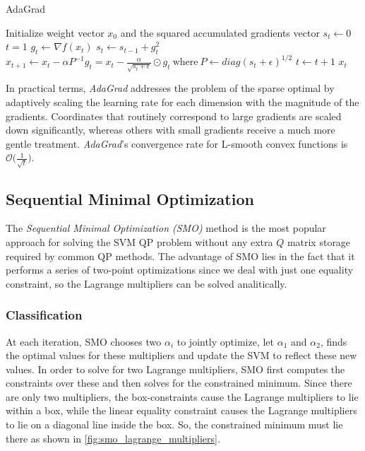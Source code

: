 \begin{algorithm}[H]
	\caption{AdaGrad}
	\label{alg:adagrad}
	\begin{algorithmic}
			\State Initialize weight vector $x_0$ and the squared accumulated gradients vector $s_t \gets 0$
			\State $t = 1$
				\State $g_t \gets \nabla f(x_t)$
				\State $s_t \gets s_{t-1} + g_t^2$
				\State $x_{t+1} \gets x_t - \alpha P^{-1} g_t = x_t - \displaystyle \frac{\alpha}{\sqrt{s_t + \epsilon}} \odot g_t \ \text{where} \ P \gets diag(s_t + \epsilon)^{1/2}$
				\State $t \gets t + 1$
			\EndWhile
			\State \Return $x_t$
		\EndFunction
	\end{algorithmic}
\end{algorithm}

In practical terms, \emph{AdaGrad} addresses the problem of the sparse optimal by adaptively scaling the learning rate for each dimension with the magnitude of the gradients. Coordinates that routinely correspond to large gradients are scaled down significantly, whereas others with small gradients receive a much more gentle treatment. \emph{AdaGrad}'s convergence rate for L-smooth convex functions is $\displaystyle \mathcal{O}\Big(\frac{1}{\sqrt{t}}\Big)$.

\pagebreak

\subsection{Sequential Minimal Optimization}

The \emph{Sequential Minimal Optimization (SMO)} \cite{platt1998sequential} method is the most popular approach for solving the SVM QP problem without any extra $Q$ matrix storage required by common QP methods. The advantage of SMO lies in the fact that it performs a series of two-point optimizations since we deal with just one equality constraint, so the Lagrange multipliers can be solved analitically.

\subsubsection{Classification}

At each iteration, SMO chooses two $\alpha_i$ to jointly optimize, let $\alpha_1$ and $\alpha_2$, finds the optimal values for these multipliers and update the SVM to reflect these new values. In order to solve for two Lagrange multipliers, SMO first computes the constraints over these and then solves for the constrained minimum. Since there are only two multipliers, the box-constraints cause the Lagrange multipliers to lie within a box, while the linear equality constraint causes the Lagrange multipliers to lie on a diagonal line inside the box. So, the constrained minimum must lie there as shown in \ref{fig:smo_lagrange_multipliers}.

